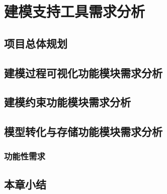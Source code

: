 \chapter{建模支持工具需求分析}

\section{项目总体规划}

\section{建模过程可视化功能模块需求分析}

\section{建模约束功能模块需求分析}

\section{模型转化与存储功能模块需求分析}
\subsection{功能性需求}

\section{本章小结}


